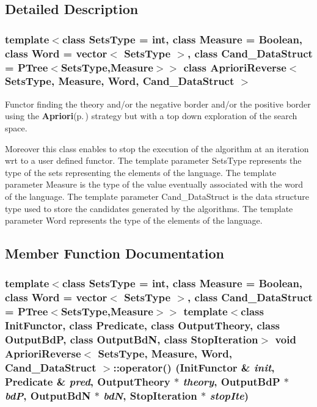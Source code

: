 \subsection{Detailed Description}
\subsubsection*{template$<$class Sets\-Type = int, class Measure = Boolean, class Word = vector$<$ Sets\-Type $>$, class Cand\_\-Data\-Struct = PTree$<$Sets\-Type,Measure$>$$>$ class Apriori\-Reverse$<$ Sets\-Type, Measure, Word, Cand\_\-Data\-Struct $>$}

Functor finding the theory and/or the negative border and/or the positive border using the {\bf Apriori}{\rm (p.\,\pageref{class_apriori})} strategy but with a top down exploration of the search space. 

Moreover this class enables to stop the execution of the algorithm at an iteration wrt to a user defined functor. The template parameter Sets\-Type represents the type of the sets representing the elements of the language. The template parameter Measure is the type of the value eventually associated with the word of the language. The template parameter Cand\_\-Data\-Struct is the data structure type used to store the candidates generated by the algorithms. The template parameter Word represents the type of the elements of the language. 



\subsection{Member Function Documentation}
\subsubsection{\setlength{\rightskip}{0pt plus 5cm}template$<$class Sets\-Type = int, class Measure = Boolean, class Word = vector$<$ Sets\-Type $>$, class Cand\_\-Data\-Struct = PTree$<$Sets\-Type,Measure$>$$>$ template$<$class Init\-Functor, class Predicate, class Output\-Theory, class Output\-Bd\-P, class Output\-Bd\-N, class Stop\-Iteration$>$ void {\bf Apriori\-Reverse}$<$ Sets\-Type, Measure, Word, Cand\_\-Data\-Struct $>$::operator() (Init\-Functor \& {\em init}, {\bf Predicate} \& {\em pred}, Output\-Theory $\ast$ {\em theory}, Output\-Bd\-P $\ast$ {\em bd\-P}, Output\-Bd\-N $\ast$ {\em bd\-N}, Stop\-Iteration $\ast$ {\em stop\-Ite})\hspace{0.3cm}{\tt  [inline]}}\label{class_apriori_reverse_a8018f226acaaa0047cf1386ed189e08}


